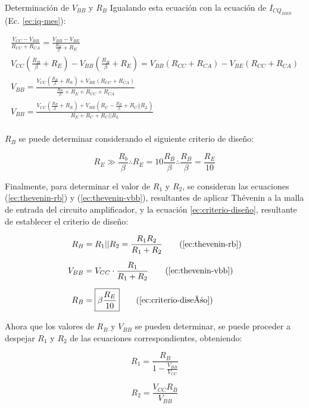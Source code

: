 \begin{frame}[allowframebreaks]{Determinación de $V_{BB}$ y $R_B$}
Igualando esta ecuación con la ecuación de $I_{CQ_{MES}}$ (Ec. \ref{ec:iq-mes}):

\begin{gather}
    \frac{V_{CC}-V_{BB}}{R_{CC} + R_{CA}}= \frac{V_{BB}-V_{BE}}{\frac{R_B}{\beta}+R_E} \nonumber\\[6pt]
    V_{CC}(\frac{R_B}{\beta}+R_E) - V_{BB}(\frac{R_B}{\beta}+R_E) = V_{BB}(R_{CC}+R_{CA}) - V_{BE}(R_{CC}+R_{CA}) \nonumber\\[6pt]
    V_{BB} = \frac{V_{CC}(\frac{R_B}{\beta}+R_E) + V_{BE}(R_{CC}+R_{CA})}{\frac{R_B}{\beta}+R_E + R_{CC} + R_{CA}} \nonumber\\[6pt]
    V_{BB} = \frac{V_{CC}(\frac{R_B}{\beta}+R_E) + V_{BE}(R_C-\frac{R_B}{\beta}+R_C||R_L)}{R_E + R_C + R_C||R_L} \label{ec:vbb}\\[6pt]
    \nonumber
\end{gather}

$R_B$ se puede determinar considerando el siguiente criterio de diseño:

\begin{equation}
    R_E  \gg \frac{R_b}{\beta} \therefore R_E = 10\frac{R_B}{\beta} \therefore \frac{R_B}{\beta} = \frac{R_E}{10} \label{ec:criterio-diseño}
\end{equation}

Finalmente, para determinar el valor de $R_1$ y $R_2$, se consideran las ecuaciones (\ref{ec:thevenin-rb}) y (\ref{ec:thevenin-vbb}), resultantes de aplicar Thévenin a la malla de entrada del circuito 
amplificador, y la ecuación \ref{ec:criterio-diseño},
resultante de establecer el criterio de diseño:

\begin{align*}
    R_B &= R_1||R_2=\frac{R_1 R_2}{R_1 + R_2} \tag{\ref{ec:thevenin-rb}}\\[6pt]
    V_{BB} &= V_{CC} \cdot \frac{R_1}{R_1 + R_2} \tag{\ref{ec:thevenin-vbb}}\\[6pt]
    R_B &= \boxed{\beta \frac{R_E}{10}} \tag{\ref{ec:criterio-diseño}}
\end{align*}

Ahora que los valores de $R_B$ y $V_{BB}$ se pueden determinar, se puede proceder a 
despejar $R_1$ y  $R_2$ de las ecuaciones correspondientes, obteniendo:

\begin{figure}[!ht]
    \centering
    \begin{minipage}[][\textheight][]{0.45\textwidth}
    \begin{equation}
        \boxed{R_1 = \frac{R_B}{1-\frac{V_{BB}}{V_{CC}}}}
        \label{eq:r1}
    \end{equation}
    \end{minipage}
    \begin{minipage}[][\textheight][]{0.45\textwidth}
    \begin{equation}
        \boxed{R_2 = \frac{V_{CC}R_B}{V_{BB}}}
        \label{eq:r2}
    \end{equation}
    \end{minipage}
\end{figure}
\end{frame}


